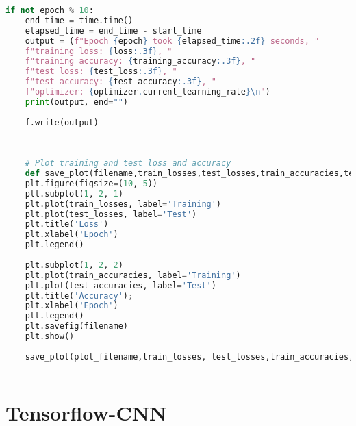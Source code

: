 \begin{lstlisting}[language=Python, caption=Model]
	if not epoch % 10:
	end_time = time.time()
	elapsed_time = end_time - start_time
	output = (f"Epoch {epoch} took {elapsed_time:.2f} seconds, "
	f"training loss: {loss:.3f}, "
	f"training accuracy: {training_accuracy:.3f}, "
	f"test loss: {test_loss:.3f}, "
	f"test accuracy: {test_accuracy:.3f}, "
	f"optimizer: {optimizer.current_learning_rate}\n")
	print(output, end="")
	
	f.write(output)
	
	
	
	# Plot training and test loss and accuracy
	def save_plot(filename,train_losses,test_losses,train_accuracies,test_accuracies):
	plt.figure(figsize=(10, 5))
	plt.subplot(1, 2, 1)
	plt.plot(train_losses, label='Training')
	plt.plot(test_losses, label='Test')
	plt.title('Loss')
	plt.xlabel('Epoch')
	plt.legend()
	
	plt.subplot(1, 2, 2)
	plt.plot(train_accuracies, label='Training')
	plt.plot(test_accuracies, label='Test')
	plt.title('Accuracy');
	plt.xlabel('Epoch')
	plt.legend()
	plt.savefig(filename)
	plt.show()
	
	save_plot(plot_filename,train_losses, test_losses,train_accuracies,test_accuracies)
	
\end{lstlisting}	

\section{Tensorflow-CNN}

